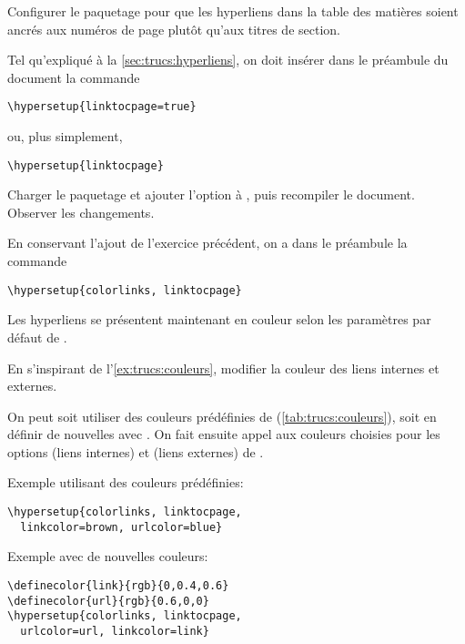 \begin{exercice}
  Configurer le paquetage  pour que les hyperliens dans
  la table des matières soient ancrés aux numéros de page plutôt
  qu'aux titres de section.
  \begin{sol}
    Tel qu'expliqué à la \autoref{sec:trucs:hyperliens}, on doit
    insérer dans le préambule du document la commande
\begin{lstlisting}
\hypersetup{linktocpage=true}
\end{lstlisting}
    ou, plus simplement,
\begin{lstlisting}
\hypersetup{linktocpage}
\end{lstlisting}
  \end{sol}
\end{exercice}

\begin{exercice}
  Charger le paquetage  et ajouter l'option
   à , puis recompiler le document.
  Observer les changements.
  \begin{sol}
    En conservant l'ajout de l'exercice précédent, on a dans le
    préambule la commande
\begin{lstlisting}
\hypersetup{colorlinks, linktocpage}
\end{lstlisting}
    Les hyperliens se présentent maintenant en couleur selon les
    paramètres par défaut de .
  \end{sol}
\end{exercice}

\begin{exercice}
  En s'inspirant de l'\autoref{ex:trucs:couleurs}, modifier la couleur
  des liens internes et externes.
  \begin{sol}
    On peut soit utiliser des couleurs prédéfinies de 
    (\autoref{tab:trucs:couleurs}), soit en  définir de nouvelles avec
    \cmd{\definecolor}. On fait ensuite appel aux couleurs choisies
    pour les options  (liens internes) et
     (liens externes) de .

    Exemple utilisant des couleurs prédéfinies:
\begin{lstlisting}
\hypersetup{colorlinks, linktocpage,
  linkcolor=brown, urlcolor=blue}
\end{lstlisting}

    Exemple avec de nouvelles couleurs:
\begin{lstlisting}
\definecolor{link}{rgb}{0,0.4,0.6}
\definecolor{url}{rgb}{0.6,0,0}
\hypersetup{colorlinks, linktocpage,
  urlcolor=url, linkcolor=link}
\end{lstlisting}
  \end{sol}
\end{exercice}

